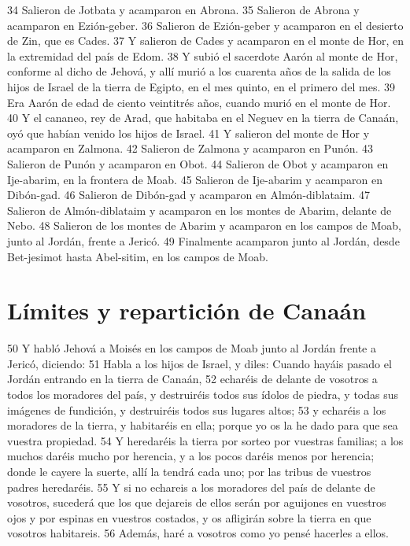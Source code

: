 34 Salieron de Jotbata y acamparon en Abrona.
35 Salieron de Abrona y acamparon en Ezión-geber.
36 Salieron de Ezión-geber y acamparon en el desierto de Zin, que es Cades.
37 Y salieron de Cades y acamparon en el monte de Hor, en la extremidad del país de Edom.
38 Y subió el sacerdote Aarón al monte de Hor, conforme al dicho de Jehová, y allí murió  a los cuarenta años de la salida de los hijos de Israel de la tierra de Egipto, en el mes quinto, en el primero del mes.
39 Era Aarón de edad de ciento veintitrés años, cuando murió en el monte de Hor.
40 Y el cananeo, rey de Arad, que habitaba en el Neguev en la tierra de Canaán, oyó que habían venido los hijos de Israel.
41 Y salieron del monte de Hor y acamparon en Zalmona.
42 Salieron de Zalmona y acamparon en Punón.
43 Salieron de Punón y acamparon en Obot.
44 Salieron de Obot y acamparon en Ije-abarim, en la frontera de Moab.
45 Salieron de Ije-abarim y acamparon en Dibón-gad.
46 Salieron de Dibón-gad y acamparon en Almón-diblataim.
47 Salieron de Almón-diblataim y acamparon en los montes de Abarim, delante de Nebo.
48 Salieron de los montes de Abarim y acamparon en los campos de Moab, junto al Jordán, frente a Jericó.
49 Finalmente acamparon junto al Jordán, desde Bet-jesimot hasta Abel-sitim, en los campos de Moab.

\section*{Límites y repartición de Canaán}

50 Y habló Jehová a Moisés en los campos de Moab junto al Jordán frente a Jericó, diciendo:
51 Habla a los hijos de Israel, y diles: Cuando hayáis pasado el Jordán entrando en la tierra de Canaán,
52 echaréis de delante de vosotros a todos los moradores del país, y destruiréis todos sus ídolos de piedra, y todas sus imágenes de fundición, y destruiréis todos sus lugares altos;
53 y echaréis a los moradores de la tierra, y habitaréis en ella; porque yo os la he dado para que sea vuestra propiedad.
54 Y heredaréis la tierra por sorteo por vuestras familias; a los muchos daréis mucho por herencia, y a los pocos daréis menos por herencia; donde le cayere la suerte, allí la tendrá cada uno; por las tribus de vuestros padres heredaréis.
55 Y si no echareis a los moradores del país de delante de vosotros, sucederá que los que dejareis de ellos serán por aguijones en vuestros ojos y por espinas en vuestros costados, y os afligirán sobre la tierra en que vosotros habitareis.
56 Además, haré a vosotros como yo pensé hacerles a ellos.

